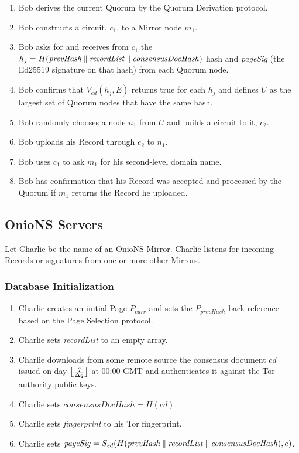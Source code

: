 \begin{enumerate}
	\item Bob derives the current Quorum by the Quorum Derivation protocol.
	\item Bob constructs a circuit, $ c_{1} $, to a Mirror node $ m_{1} $.
	\item Bob asks for and receives from $ c_{1} $ the $ h_{j} = H(\mathit{prevHash} \concat \mathit{recordList} \concat \mathit{consensusDocHash}) $ hash and \emph{pageSig} (the Ed25519 signature on that hash) from each Quorum node.
	\item Bob confirms that $ V_{\mathit{ed}}(h_{j}, E) $ returns true for each $ h_{j} $ and defines $ U $ as the largest set of Quorum nodes that have the same hash.
	\item Bob randomly chooses a node $ n_{1} $ from $ U $ and builds a circuit to it, $ c_{2} $.
	\item Bob uploads his Record through $ c_{2} $ to $ n_{1} $.
	\item Bob uses $ c_{1} $ to ask $ m_{1} $ for his second-level domain name.
	\item Bob has confirmation that his Record was accepted and processed by the Quorum if $ m_{1} $ returns the Record he uploaded.
\end{enumerate}

\subsection{OnioNS Servers}
\label{sec:ProtoOnioNServers}

Let Charlie be the name of an OnioNS Mirror. Charlie listens for incoming Records or signatures from one or more other Mirrors.

\subsubsection{Database Initialization}

\begin{enumerate}
	\item Charlie creates an initial Page $ P_{\mathit{curr}} $ and sets the $ P_{\mathit{prevHash}} $ back-reference based on the Page Selection protocol.
	\item Charlie sets \emph{recordList} to an empty array.
	\item Charlie downloads from some remote source the consensus document $ \mathit{cd} $ issued on day $ \floor[\big]{\frac{q}{\Delta q}} $ at 00:00 GMT and authenticates it against the Tor authority public keys.
	\item Charlie sets $ \mathit{consensusDocHash} = H(\mathit{cd}) $.
	\item Charlie sets \emph{fingerprint} to his Tor fingerprint.
	\item Charlie sets $ \mathit{pageSig} = S_{\mathit{ed}}(H(\mathit{prevHash} \concat \mathit{recordList} \concat \mathit{consensusDocHash}), e) $.
\end{enumerate}


